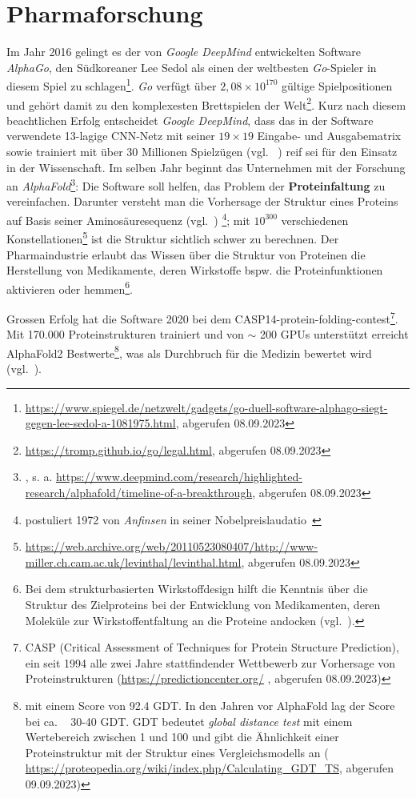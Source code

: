 \section{Pharmaforschung}
Im Jahr 2016 gelingt es der von \textit{Google DeepMind} entwickelten Software \textit{AlphaGo}, den Südkoreaner Lee Sedol als einen der weltbesten \textit{Go}-Spieler in diesem Spiel zu schlagen\footnote{
    \url{https://www.spiegel.de/netzwelt/gadgets/go-duell-software-alphago-siegt-gegen-lee-sedol-a-1081975.html}, abgerufen 08.09.2023
}. \textit{Go} verfügt über $2,08 \times 10^{170}$ gültige Spielpositionen und gehört damit zu den komplexesten Brettspielen der Welt\footnote{
    \url{https://tromp.github.io/go/legal.html}, abgerufen 08.09.2023
}. Kurz nach diesem beachtlichen Erfolg entscheidet \textit{Google DeepMind}, dass das in der Software verwendete 13-lagige CNN-Netz mit seiner $19 \times 19$ Eingabe- und Ausgabematrix sowie trainiert mit über 30 Millionen Spielzügen (vgl. ~\cite[371]{Ert21c}) reif sei für den Einsatz in der Wissenschaft. Im selben Jahr beginnt das Unternehmen mit der Forschung an \textit{AlphaFold}\footnote{
    \cite{JEP+21}, s. a. \url{https://www.deepmind.com/research/highlighted-research/alphafold/timeline-of-a-breakthrough}, abgerufen 08.09.2023
}: Die Software soll helfen, das Problem der \textbf{Proteinfaltung} zu vereinfachen. Darunter versteht man die Vorhersage der Struktur eines Proteins auf Basis seiner Aminosäuresequenz (vgl.~\cite{DOSW08}) \footnote{
    postuliert 1972 von \textit{Anfinsen} in seiner Nobelpreislaudatio~\cite[223]{Anf73}
}; mit $10^{300}$ verschiedenen Konstellationen\footnote{
    \url{https://web.archive.org/web/20110523080407/http://www-miller.ch.cam.ac.uk/levinthal/levinthal.html}, abgerufen 08.09.2023
} ist die Struktur sichtlich schwer zu berechnen. Der Pharmaindustrie erlaubt das Wissen über die Struktur von Proteinen die Herstellung von Medikamente, deren Wirkstoffe bspw. die Proteinfunktionen aktivieren oder hemmen\footnote{
    Bei dem strukturbasierten Wirkstoffdesign hilft die Kenntnis über die Struktur des Zielproteins bei der Entwicklung von Medikamenten, deren Moleküle zur Wirkstoffentfaltung an die Proteine andocken (vgl.~\cite[29 ff.]{SKM10}).
}.

Grossen Erfolg hat die Software 2020 bei dem CASP14-protein-folding-contest\footnote{
    CASP (Critical Assessment of Techniques for Protein Structure Prediction), ein seit 1994 alle zwei Jahre stattfindender Wettbewerb zur Vorhersage von Proteinstrukturen (\url{https://predictioncenter.org/} , abgerufen 08.09.2023)
}. Mit 170.000 Proteinstrukturen trainiert und von $\sim$ 200 GPUs unterstützt erreicht AlphaFold2 Bestwerte\footnote{
    mit einem Score von 92.4 GDT. In den Jahren vor AlphaFold lag der Score bei ca. ~ 30-40 GDT. GDT bedeutet \textit{global distance test} mit einem Wertebereich zwischen 1 und 100 und gibt die Ähnlichkeit einer Proteinstruktur mit der Struktur eines Vergleichsmodells an (
    \url{https://proteopedia.org/wiki/index.php/Calculating_GDT_TS}, abgerufen 09.09.2023)
}, was als Durchbruch für die Medizin bewertet wird (vgl.~\cite[204]{Cal20}).


